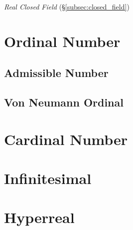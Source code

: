 \documentclass{article}
\begin{document}
\emph{Real Closed Field} (\S\ref{subsec:closed_field})



\section{Ordinal Number}\label{sec:ordinal_number}

\subsection{Admissible Number}\label{subsec:admissible_ordinal}

\subsection{Von Neumann Ordinal}\label{subsec:vonneumann_ordinal}



\section{Cardinal Number}\label{sec:cardinal_number}



\section{Infinitesimal}\label{sec:infinitesimal}



\section{Hyperreal}\label{sec:hyperreal}
\end{document}
